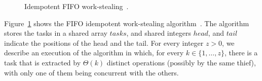 \begin{figure}
    \caption{\label{fig-idempotent-fifo}Idempotent FIFO work-stealing~\cite{maged.vechev.2009}.}
\end{figure}

Figure~\ref{fig-idempotent-fifo} shows the FIFO idempotent work-stealing algorithm~\cite{maged.vechev.2009}. The algorithm stores the tasks in a shared array $tasks$, and shared integers $head$, and $tail$ indicate the positions of the head and the tail.  For every integer $z > 0$, we describe an execution of the algorithm in which, for every $k \in \{1, \hdots, z\}$, there is a task that is extracted by $\Theta(k)$ distinct operations (possibly by the same thief), with only one of them being concurrent with the others.

